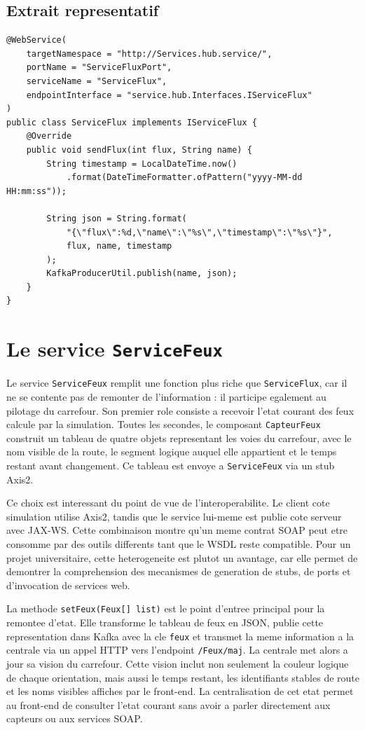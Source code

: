 \documentclass[12pt,a4paper]{report}
\begin{document}
\section*{Extrait representatif}
\begin{verbatim}
@WebService(
    targetNamespace = "http://Services.hub.service/",
    portName = "ServiceFluxPort",
    serviceName = "ServiceFlux",
    endpointInterface = "service.hub.Interfaces.IServiceFlux"
)
public class ServiceFlux implements IServiceFlux {
    @Override
    public void sendFlux(int flux, String name) {
        String timestamp = LocalDateTime.now()
            .format(DateTimeFormatter.ofPattern("yyyy-MM-dd HH:mm:ss"));

        String json = String.format(
            "{\"flux\":%d,\"name\":\"%s\",\"timestamp\":\"%s\"}",
            flux, name, timestamp
        );
        KafkaProducerUtil.publish(name, json);
    }
}
\end{verbatim}

\chapter{Le service \texttt{ServiceFeux}}
Le service \texttt{ServiceFeux} remplit une fonction plus riche que \texttt{ServiceFlux}, car il ne se contente pas de remonter de l'information : il participe egalement au pilotage du carrefour. Son premier role consiste a recevoir l'etat courant des feux calcule par la simulation. Toutes les secondes, le composant \texttt{CapteurFeux} construit un tableau de quatre objets representant les voies du carrefour, avec le nom visible de la route, le segment logique auquel elle appartient et le temps restant avant changement. Ce tableau est envoye a \texttt{ServiceFeux} via un stub Axis2.

Ce choix est interessant du point de vue de l'interoperabilite. Le client cote simulation utilise Axis2, tandis que le service lui-meme est publie cote serveur avec JAX-WS. Cette combinaison montre qu'un meme contrat SOAP peut etre consomme par des outils differents tant que le WSDL reste compatible. Pour un projet universitaire, cette heterogeneite est plutot un avantage, car elle permet de demontrer la comprehension des mecanismes de generation de stubs, de ports et d'invocation de services web.

La methode \texttt{setFeux(Feux[] list)} est le point d'entree principal pour la remontee d'etat. Elle transforme le tableau de feux en JSON, publie cette representation dans Kafka avec la cle \texttt{feux} et transmet la meme information a la centrale via un appel HTTP vers l'endpoint \texttt{/Feux/maj}. La centrale met alors a jour sa vision du carrefour. Cette vision inclut non seulement la couleur logique de chaque orientation, mais aussi le temps restant, les identifiants stables de route et les noms visibles affiches par le front-end. La centralisation de cet etat permet au front-end de consulter l'etat courant sans avoir a parler directement aux capteurs ou aux services SOAP.
\end{document}
